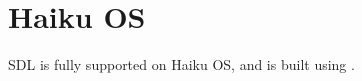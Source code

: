 \chapter{Haiku OS }
\hypertarget{md__mono_runtime_2extern_2sdl_2docs_2_r_e_a_d_m_e-haiku}{}\label{md__mono_runtime_2extern_2sdl_2docs_2_r_e_a_d_m_e-haiku}
\label{md__mono_runtime_2extern_2sdl_2docs_2_r_e_a_d_m_e-haiku_autotoc_md1331}%
%


SDL is fully supported on Haiku OS, and is built using . 
